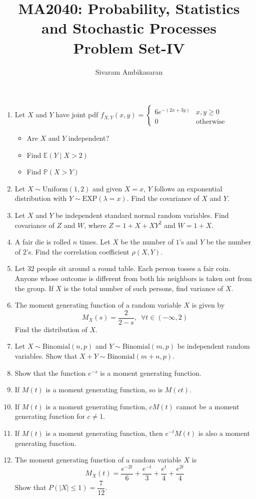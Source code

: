 \documentclass{article}
\title{MA2040: Probability, Statistics and Stochastic Processes\\
Problem Set-IV}
\author{Sivaram Ambikasaran}
\newcommand{\abs}[1]{\displaystyle\left\lvert#1\right\rvert}
\newcommand{\Pb}{\mathbb{P}}
\newcommand{\bkt}[1]{\left(#1\right)}
\begin{document}
	\maketitle
	\begin{enumerate}
		\item
		Let $X$ and $Y$ have joint pdf $f_{X,Y}(x,y) = \begin{cases}
		6 e^{-\bkt{2x+3y}} & x,y \geq 0\\
		0 & \text{otherwise}
		\end{cases}$
	\begin{itemize}
		\item
		Are $X$ and $Y$ independent?
		\item
		Find $\mathbb{E}\bkt{Y \mid X>2}$
		\item
		Find $\Pb\bkt{X > Y}$
	\end{itemize}
	\item
	Let $X \sim \text{Uniform}(1,2)$ and given $X=x$, $Y$ follows an exponential distribution with $Y \sim \text{EXP}\bkt{\lambda=x}$. Find the covariance of $X$ and $Y$.
	\item
	Let $X$ and $Y$ be independent standard normal random variables. Find covariance of $Z$ and $W$, where $Z = 1+X+XY^2$ and $W = 1+X$.
	\item
	A fair die is rolled $n$ times. Let $X$ be the number of $1$'s and $Y$ be the number of $2$'s. Find the correlation coefficient $\rho(X,Y)$.
	\item
	Let $32$ people sit around a round table. Each person tosses a fair coin. Anyone whose outcome is different from both his neighbors is taken out from the group. If $X$ is the total number of such persons, find variance of $X$.
	\item
	The moment generating function of a random variable $X$ is given by
	$$M_X(s) = \dfrac2{2-s}, \,\,\, \forall t \in (-\infty,2)$$
	Find the distribution of $X$.
	\item
	Let $X \sim \text{Binomial}(n,p)$ and $Y \sim \text{Binomial}(m,p)$ be independent random variables. Show that $X+Y \sim \text{Binomial}(m+n,p)$.
	\item
	Show that the function $e^{-s}$ is a moment generating function.
	\item
	If $M(t)$ is a moment generating function, so is $M(ct)$.
	\item
	If $M(t)$ is a moment generating function, $cM(t)$ cannot be a moment generating function for $c \neq 1$.
	\item
	If $M(t)$ is a moment generating function, then $e^{-t}M(t)$ is also a moment generating function.
	\item
	The moment generating function of a random variable $X$ is
	$$M_X(t) = \dfrac{e^{-2t}}6 + \dfrac{e^{-t}}3 + \dfrac{e^{t}}4 + \dfrac{e^{2t}}4$$
	Show that $P\bkt{\abs{X} \leq 1} = \dfrac7{12}$.
	\end{enumerate}
\end{document}
